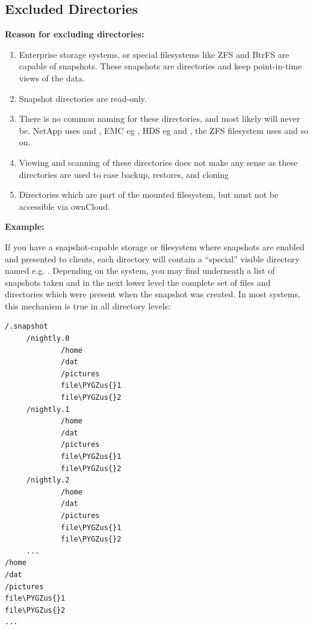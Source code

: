 \documentclass[letterpaper,10pt,english]{sphinxmanual}
\def\PYGZus{\char`\_}
\begin{document}
\subsection{Excluded Directories}
\label{configuration_server/excluded_blacklisted_files:excluded-directories}
\textbf{Reason for excluding directories:}
\begin{enumerate}
\item {} 
Enterprise storage systems, or special filesystems like ZFS and BtrFS are capable of snapshots. These snapshots are directories and keep point-in-time views of the data.

\item {} 
Snapshot directories are read-only.

\item {} 
There is no common naming for these directories, and most likely will never be. NetApp uses  and , EMC eg , HDS eg  and , the ZFS filesystem uses  and so on.

\item {} 
Viewing and scanning of these directories does not make any sense as these directories are used to ease backup, restores, and cloning

\item {} 
Directories which are part of the mounted filesystem, but must not be accessible via ownCloud.

\end{enumerate}

\textbf{Example:}

If you have a snapshot-capable storage or filesystem where snapshots are enabled and presented to clients, each directory will contain a ``special'' visible directory named e.g. . Depending on the system, you may find underneath a list of snapshots taken and in the next lower level the complete set of files and directories which were present when the snapshot was created. In most systems, this mechanism is true in all directory levels:

\begin{Verbatim}[commandchars=\\\{\}]
/.snapshot
     /nightly.0
             /home
             /dat
             /pictures
             file\PYGZus{}1
             file\PYGZus{}2
     /nightly.1
             /home
             /dat
             /pictures
             file\PYGZus{}1
             file\PYGZus{}2
     /nightly.2
             /home
             /dat
             /pictures
             file\PYGZus{}1
             file\PYGZus{}2
     ...
/home
/dat
/pictures
file\PYGZus{}1
file\PYGZus{}2
...
\end{Verbatim}
\end{document}
